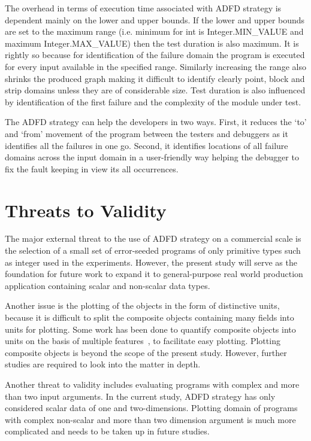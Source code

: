 The overhead in terms of execution time associated with ADFD strategy is dependent mainly on the lower and upper bounds. If the lower and upper bounds are set to the maximum range (i.e. minimum for int is Integer.MIN\_VALUE and maximum Integer.MAX\_VALUE) then the test duration is also maximum. It is rightly so because for identification of the failure domain the program is executed for every input available in the specified range. Similarly increasing the range also shrinks the produced graph making it difficult to identify clearly point, block and strip domains unless they are of considerable size. Test duration is also influenced by identification of the first failure and the complexity of the module under test.

The ADFD strategy can help the developers in two ways. First, it reduces the `to' and `from' movement of the program between the testers and debuggers as it identifies all the failures in one go. Second, it identifies locations of all failure domains across the input domain in a user-friendly way helping the debugger to fix the fault keeping in view its all occurrences.


\section{Threats to Validity} \label{sec:validity}
The major external threat to the use of ADFD strategy on a commercial scale is the selection of a small set of error-seeded programs of only primitive types such as integer used in the experiments. However, the present study will serve as the foundation for future work to expand it to general-purpose real world production application containing scalar and non-scalar data types.

Another issue is the plotting of the objects in the form of distinctive units, because it is difficult to split the composite objects containing many fields into units for plotting. Some work has been done to quantify composite objects into units on the basis of multiple features~\cite{ciupa2006object}, to facilitate easy plotting. Plotting composite objects is beyond the scope of the present study. However, further studies are required to look into the matter in depth. 

Another threat to validity includes evaluating programs with complex and more than two input arguments. In the current study, ADFD strategy has only considered scalar data of one and two-dimensions. Plotting domain of programs with complex non-scalar and more than two dimension argument is much more complicated and needs to be taken up in future studies.

